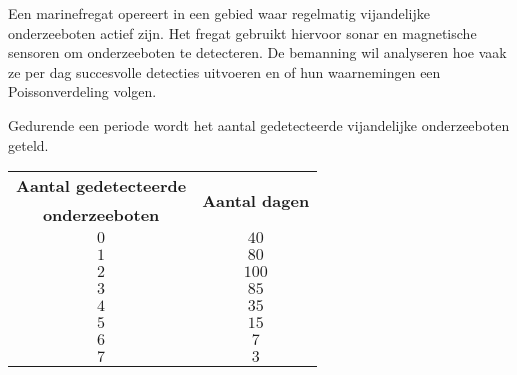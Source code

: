 \begin{question}{25}{
    Een marinefregat opereert in een gebied waar regelmatig vijandelijke onderzeeboten actief zijn.
    Het fregat gebruikt hiervoor sonar en magnetische sensoren om onderzeeboten te detecteren.
    De bemanning wil analyseren hoe vaak ze per dag succesvolle detecties uitvoeren en of hun waarnemingen een Poissonverdeling volgen.

    Gedurende een periode wordt het aantal gedetecteerde vijandelijke onderzeeboten geteld.
    \begin{center}
        \begin{tabular}{cc}
            \toprule
                \textbf{Aantal gedetecteerde} & \multirow{2}{*}{\textbf{Aantal dagen}} \\
                \textbf{onderzeeboten}        & \\
            \midrule
                $0$ & $40$ \\
                $1$ & $80$ \\
                $2$ & $100$ \\
                $3$ & $85$ \\
                $4$ & $35$ \\
                $5$ & $15$ \\
                $6$ & $7$ \\
                $7$ & $3$ \\
            \bottomrule
        \end{tabular}
    \end{center}
}


\end{question}
